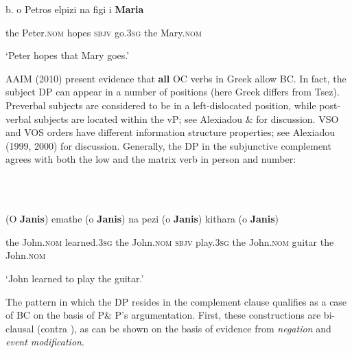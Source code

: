 \documentclass[output=paper]{langsci/langscibook}
\begin{document}
\begin{styleNurTexti}
    b.   o     Petros    elpizi  na    figi     i     \textbf{Maria}
\end{styleNurTexti}

\begin{styleNurTexti}
          the    Peter.\textsc{nom}   hopes  \textsc{sbjv}  go.\textsc{3sg}  the    Mary.\textsc{nom}
\end{styleNurTexti}

\begin{styleNurTexti}
         ‘Peter hopes that Mary goes.’
\end{styleNurTexti}

\begin{styleNurTexti}
AAIM (2010) present evidence that \textbf{all} OC verbs in Greek allow BC. In fact, the subject DP can appear in a number of positions (here Greek differs from Tsez). Preverbal subjects are considered to be in a left-dislocated position, while post-verbal subjects are located within the vP; see Alexiadou \& \citet{Anagnostopoulou1998} for discussion. VSO and VOS orders have different information structure properties; see Alexiadou (1999, 2000) for discussion.  Generally, the DP in the subjunctive complement agrees with both the low and the matrix verb in person and number:
\end{styleNurTexti}

\begin{styleNurTexti}
\ea%
    \label{ex:key:6}
    \gll\\
        \\
    \glt
    \z

          (O \textbf{Janis}) emathe (o \textbf{Janis}) na pezi  (o \textbf{Janis}) kithara (o \textbf{Janis})
\end{styleNurTexti}

\begin{styleNurTexti}
the John.\textsc{nom} learned.\textsc{3sg} the John.\textsc{nom sbjv} play.\textsc{3sg} the John.\textsc{nom} guitar the John.\textsc{nom}
\end{styleNurTexti}

\begin{styleNurTexti}
  ‘John learned to play the guitar.’
\end{styleNurTexti}

\begin{styleNurTexti}
The pattern in which the DP resides in the complement clause qualifies as a case of BC on the basis of P\& P’s argumentation. First, these constructions are bi-clausal (contra \citealt{Roussou2009}), as can be shown on the basis of evidence from \textit{negation} and \textit{event modification}.
\end{styleNurTexti}
\end{document}
